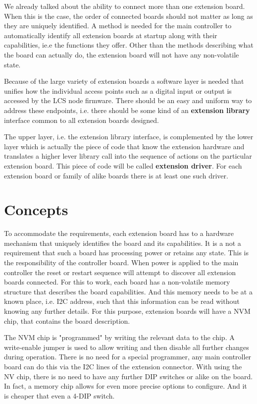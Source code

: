 We already talked about the ability to connect more than one extension board. When this is the case, the order of connected boards should not matter as long as they are uniquely identified. A method is needed for the main controller to automatically identify all extension boards at startup along with their capabilities, ie.e the functions they offer. Other than the methods describing what the board can actually do, the extension board will not have any non-volatile state.

Because of the large variety of extension boards a software layer is needed that unifies how the individual access points such as a digital input or output is accessed by the LCS node firmware. There should be an easy and uniform way to address these endpoints, i.e. there should be some kind of an \textbf{extension library} interface common to all extension boards designed.

The upper layer, i.e. the extension library interface, is complemented by the lower layer which is actually the piece of code that know the extension hardware and translates a higher lever library call into the sequence of actions on the particular extension board. This piece of code will be called \textbf{extension driver}. For each extension board or family of alike boards there is at least one such driver.

\section{Concepts}

To accommodate the requirements, each extension board has to a hardware mechanism that uniquely identifies the board and its capabilities. It is a not a requirement that such a board has processing power or retains any state. This is the responsibility of the controller board. When power is applied to the main controller the reset or restart sequence will attempt to discover all extension boards connected. For this to work, each board has a non-volatile memory structure that describes the board capabilities. And this memory needs to be at a known place, i.e. I2C address, such that this information can be read without knowing any further details. For this purpose, extension boards will have a NVM chip, that contains the board description.

The NVM chip is "programmed" by writing the relevant data to the chip. A write-enable jumper is used to allow writing and then disable all further changes during operation. There is no need for a special programmer, any main controller board can do this via the I2C lines of the extension connector. With using the NV chip, there is no need to have any further DIP switches or alike on the board. In fact, a memory chip allows for even more precise options to configure. And it is cheaper that even a 4-DIP switch.

